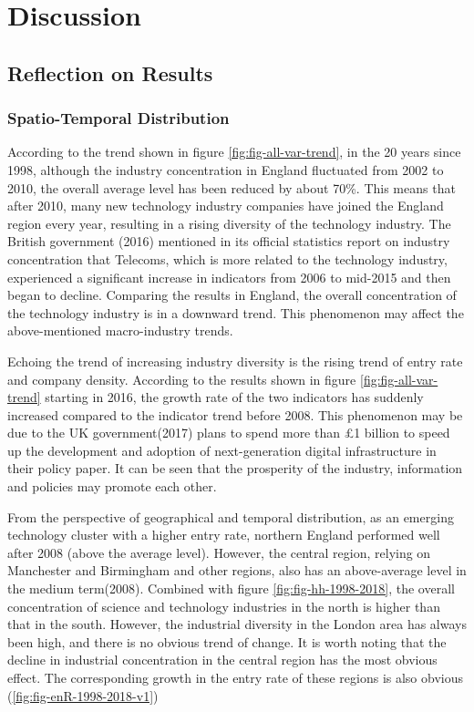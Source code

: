 \documentclass[
  12pt,
  oneside]{book}
\begin{document}
\hypertarget{discussion}{%
\chapter{Discussion}\label{discussion}}

\hypertarget{reflection-on-results}{%
\section{Reflection on Results}\label{reflection-on-results}}

\hypertarget{spatio-temporal-distribution}{%
\subsection{Spatio-Temporal Distribution}\label{spatio-temporal-distribution}}

According to the trend shown in figure \ref{fig:fig-all-var-trend}, in the 20 years since 1998, although the industry concentration in England fluctuated from 2002 to 2010, the overall average level has been reduced by about 70\%. This means that after 2010, many new technology industry companies have joined the England region every year, resulting in a rising diversity of the technology industry. The British government (2016) mentioned in its official statistics report on industry concentration that Telecoms, which is more related to the technology industry, experienced a significant increase in indicators from 2006 to mid-2015 and then began to decline. Comparing the results in England, the overall concentration of the technology industry is in a downward trend. This phenomenon may affect the above-mentioned macro-industry trends.

Echoing the trend of increasing industry diversity is the rising trend of entry rate and company density. According to the results shown in figure \ref{fig:fig-all-var-trend} starting in 2016, the growth rate of the two indicators has suddenly increased compared to the indicator trend before 2008. This phenomenon may be due to the UK government(2017) plans to spend more than £1 billion to speed up the development and adoption of next-generation digital infrastructure in their policy paper. It can be seen that the prosperity of the industry, information and policies may promote each other.

From the perspective of geographical and temporal distribution, as an emerging technology cluster with a higher entry rate, northern England performed well after 2008 (above the average level). However, the central region, relying on Manchester and Birmingham and other regions, also has an above-average level in the medium term(2008). Combined with figure \ref{fig:fig-hh-1998-2018}, the overall concentration of science and technology industries in the north is higher than that in the south. However, the industrial diversity in the London area has always been high, and there is no obvious trend of change. It is worth noting that the decline in industrial concentration in the central region has the most obvious effect. The corresponding growth in the entry rate of these regions is also obvious (\ref{fig:fig-enR-1998-2018-v1})
\end{document}

